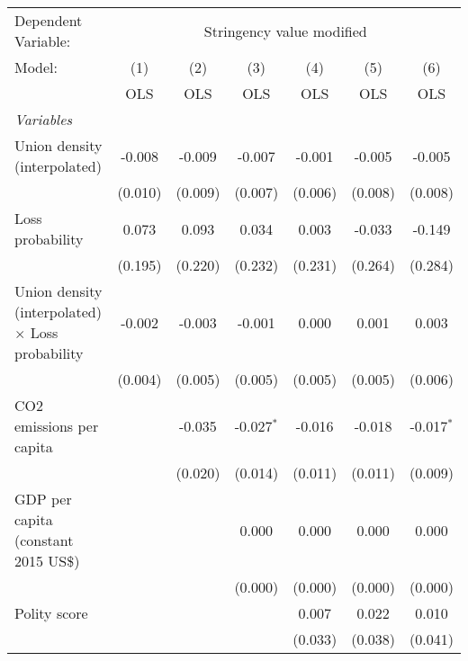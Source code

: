
\begingroup
\centering
\begin{tabular}{lcccccc}
   \toprule
   Dependent Variable: & \multicolumn{6}{c}{Stringency value modified}\\
   Model:                                                  & (1)     & (2)     & (3)          & (4)     & (5)     & (6)\\  
                                                           &  OLS    & OLS     & OLS          & OLS     & OLS     & OLS\\  
   \midrule
   \emph{Variables}\\
   Union density (interpolated)                            & -0.008  & -0.009  & -0.007       & -0.001  & -0.005  & -0.005\\   
                                                           & (0.010) & (0.009) & (0.007)      & (0.006) & (0.008) & (0.008)\\   
   Loss probability                                        & 0.073   & 0.093   & 0.034        & 0.003   & -0.033  & -0.149\\   
                                                           & (0.195) & (0.220) & (0.232)      & (0.231) & (0.264) & (0.284)\\   
   Union density (interpolated) $\times$ Loss probability  & -0.002  & -0.003  & -0.001       & 0.000   & 0.001   & 0.003\\   
                                                           & (0.004) & (0.005) & (0.005)      & (0.005) & (0.005) & (0.006)\\   
   CO2 emissions per capita                                &         & -0.035  & -0.027$^{*}$ & -0.016  & -0.018  & -0.017$^{*}$\\   
                                                           &         & (0.020) & (0.014)      & (0.011) & (0.011) & (0.009)\\   
   GDP per capita (constant 2015 US\$)                     &         &         & 0.000        & 0.000   & 0.000   & 0.000\\   
                                                           &         &         & (0.000)      & (0.000) & (0.000) & (0.000)\\   
   Polity score                                            &         &         &              & 0.007   & 0.022   & 0.010\\   
                                                           &         &         &              & (0.033) & (0.038) & (0.041)\\   

\end{tabular}
